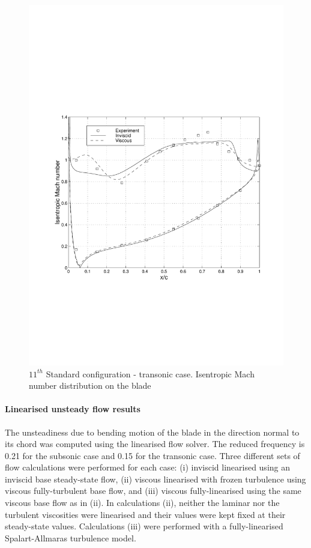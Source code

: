 \begin{figure}[ht]
 \centerline{\includegraphics[width=130mm,clip=t]{CHAP_LINEAR/FIGURE/steady_11th_m099_mac_bla.pdf}}
 \caption{$11^{th}$ Standard configuration - transonic case.
           Isentropic Mach number distribution on the blade}
 \label{conf11_mac_bla_099.fig}
\end{figure}
%
%
%
\paragraph{Linearised unsteady flow results}
 The unsteadiness  due to bending motion
 of the blade in the direction normal to its chord was computed using the linearised
 flow solver. The  reduced frequency is 0.21 for the
 subsonic case and 0.15 for the transonic case.  Three different sets of flow calculations were
 performed for each case:  (i) inviscid linearised using an inviscid base steady-state flow,
 (ii) viscous linearised with frozen turbulence using viscous fully-turbulent
 base flow, and (iii) viscous fully-linearised  using the same viscous
 base flow as in (ii).
 In calculations (ii), neither the laminar nor the turbulent
 viscosities were linearised and their values were kept fixed at their steady-state values.
 Calculations (iii) were performed with a fully-linearised Spalart-Allmaras turbulence
 model.

